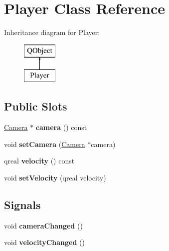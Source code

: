 \hypertarget{class_player}{}\section{Player Class Reference}
\label{class_player}
Inheritance diagram for Player\+:\begin{figure}[H]
\begin{center}
\leavevmode
\includegraphics[height=2.000000cm]{class_player}
\end{center}
\end{figure}
\subsection*{Public Slots}
\begin{DoxyCompactItemize}
\item 
\hypertarget{class_player_a10605ebcab0fac1b542d1bd8f3d23acd}{}\hyperlink{class_camera}{Camera} $\ast$ {\bfseries camera} () const \label{class_player_a10605ebcab0fac1b542d1bd8f3d23acd}

\item 
\hypertarget{class_player_af5e57b3a9719cd999aff21d59355be52}{}void {\bfseries set\+Camera} (\hyperlink{class_camera}{Camera} $\ast$camera)\label{class_player_af5e57b3a9719cd999aff21d59355be52}

\item 
\hypertarget{class_player_a836e1afdde2c379b964bcf5d3811f0da}{}qreal {\bfseries velocity} () const \label{class_player_a836e1afdde2c379b964bcf5d3811f0da}

\item 
\hypertarget{class_player_ae2d5423c7bf6c6c924a451dc1cdab6aa}{}void {\bfseries set\+Velocity} (qreal velocity)\label{class_player_ae2d5423c7bf6c6c924a451dc1cdab6aa}

\end{DoxyCompactItemize}
\subsection*{Signals}
\begin{DoxyCompactItemize}
\item 
\hypertarget{class_player_aef620bc75871b32311560a7b2a31c144}{}void {\bfseries camera\+Changed} ()\label{class_player_aef620bc75871b32311560a7b2a31c144}

\item 
\hypertarget{class_player_a22ae3d9604e92fa12cfad39fe40e8651}{}void {\bfseries velocity\+Changed} ()\label{class_player_a22ae3d9604e92fa12cfad39fe40e8651}

\end{DoxyCompactItemize}
